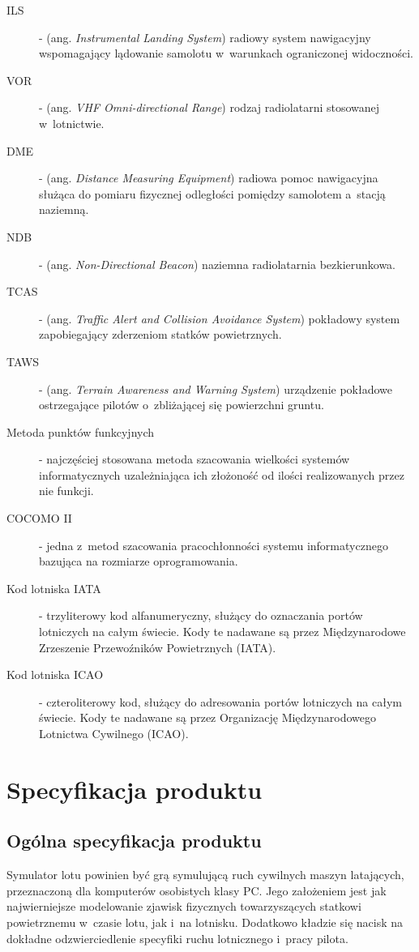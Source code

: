 \documentclass{mwrep}
\begin{document}
\begin{description}
\item[ILS] - (ang. \emph{Instrumental Landing System}) radiowy system nawigacyjny wspomagający lądowanie samolotu w~warunkach ograniczonej widoczności.
\item[VOR] - (ang. \emph{VHF Omni-directional Range}) rodzaj radiolatarni stosowanej w~lotnictwie.
\item[DME] - (ang. \emph{Distance Measuring Equipment}) radiowa pomoc nawigacyjna służąca do pomiaru fizycznej odległości pomiędzy samolotem a~stacją naziemną.
\item[NDB] - (ang. \emph{Non-Directional Beacon}) naziemna radiolatarnia bezkierunkowa.
\item[TCAS] - (ang. \emph{Traffic Alert and Collision Avoidance System}) pokładowy system zapobiegający zderzeniom statków powietrznych.
\item[TAWS] - (ang. \emph{Terrain Awareness and Warning System}) urządzenie pokładowe ostrzegające pilotów o~zbliżającej się powierzchni gruntu.
\item[Metoda punktów funkcyjnych] - najczęściej stosowana metoda szacowania wielkości systemów informatycznych uzależniająca ich złożoność od ilości realizowanych przez nie funkcji.
\item[COCOMO II] - jedna z~metod szacowania pracochłonności systemu informatycznego bazująca na rozmiarze oprogramowania.
\item[Kod lotniska IATA] - trzyliterowy kod alfanumeryczny, służący do oznaczania portów lotniczych na całym świecie. Kody te nadawane są przez Międzynarodowe Zrzeszenie Przewoźników Powietrznych (IATA).
\item[Kod lotniska ICAO] - czteroliterowy kod, służący do adresowania portów lotniczych na całym świecie. Kody te nadawane są przez  Organizację Międzynarodowego Lotnictwa Cywilnego (ICAO).
\end{description}

\chapter{Specyfikacja produktu}

\section{Ogólna specyfikacja produktu}

Symulator lotu powinien być grą symulującą ruch cywilnych maszyn latających, przeznaczoną dla komputerów osobistych klasy PC. Jego założeniem jest jak najwierniejsze modelowanie zjawisk fizycznych towarzyszących statkowi powietrznemu w~czasie lotu, jak i~na lotnisku. Dodatkowo kładzie się nacisk na dokładne odzwierciedlenie specyfiki ruchu lotnicznego i~pracy pilota.
\end{document}
